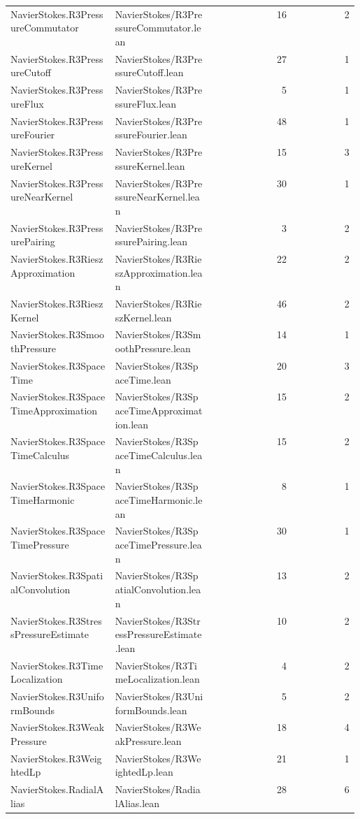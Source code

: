 \begin{longtable}{p{0.30\linewidth}p{0.28\linewidth}rr}
NavierStokes.R3PressureCommutator & NavierStokes/R3PressureCommutator.lean & 16 & 2\\
NavierStokes.R3PressureCutoff & NavierStokes/R3PressureCutoff.lean & 27 & 1\\
NavierStokes.R3PressureFlux & NavierStokes/R3PressureFlux.lean & 5 & 1\\
NavierStokes.R3PressureFourier & NavierStokes/R3PressureFourier.lean & 48 & 1\\
NavierStokes.R3PressureKernel & NavierStokes/R3PressureKernel.lean & 15 & 3\\
NavierStokes.R3PressureNearKernel & NavierStokes/R3PressureNearKernel.lean & 30 & 1\\
NavierStokes.R3PressurePairing & NavierStokes/R3PressurePairing.lean & 3 & 2\\
NavierStokes.R3RieszApproximation & NavierStokes/R3RieszApproximation.lean & 22 & 2\\
NavierStokes.R3RieszKernel & NavierStokes/R3RieszKernel.lean & 46 & 2\\
NavierStokes.R3SmoothPressure & NavierStokes/R3SmoothPressure.lean & 14 & 1\\
NavierStokes.R3SpaceTime & NavierStokes/R3SpaceTime.lean & 20 & 3\\
NavierStokes.R3SpaceTimeApproximation & NavierStokes/R3SpaceTimeApproximation.lean & 15 & 2\\
NavierStokes.R3SpaceTimeCalculus & NavierStokes/R3SpaceTimeCalculus.lean & 15 & 2\\
NavierStokes.R3SpaceTimeHarmonic & NavierStokes/R3SpaceTimeHarmonic.lean & 8 & 1\\
NavierStokes.R3SpaceTimePressure & NavierStokes/R3SpaceTimePressure.lean & 30 & 1\\
NavierStokes.R3SpatialConvolution & NavierStokes/R3SpatialConvolution.lean & 13 & 2\\
NavierStokes.R3StressPressureEstimate & NavierStokes/R3StressPressureEstimate.lean & 10 & 2\\
NavierStokes.R3TimeLocalization & NavierStokes/R3TimeLocalization.lean & 4 & 2\\
NavierStokes.R3UniformBounds & NavierStokes/R3UniformBounds.lean & 5 & 2\\
NavierStokes.R3WeakPressure & NavierStokes/R3WeakPressure.lean & 18 & 4\\
NavierStokes.R3WeightedLp & NavierStokes/R3WeightedLp.lean & 21 & 1\\
NavierStokes.RadialAlias & NavierStokes/RadialAlias.lean & 28 & 6\\

\end{longtable}
